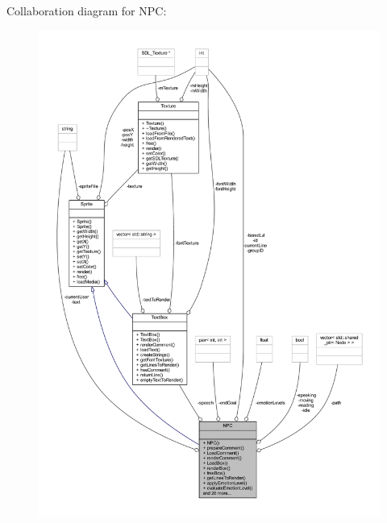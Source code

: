Collaboration diagram for N\+PC\+:\nopagebreak
\begin{figure}[H]
\begin{center}
\leavevmode
\includegraphics[width=350pt]{class_n_p_c__coll__graph}
\end{center}
\end{figure}
